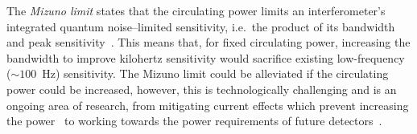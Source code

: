 \label{sec:circulating_power}

The \emph{Mizuno limit} states that the circulating power limits an interferometer's integrated quantum noise--limited sensitivity, i.e.\ the product of its bandwidth and peak sensitivity~\cite{miaoFundamentalQuantumLimit2017}.
This means that, for fixed circulating power, increasing the bandwidth to improve kilohertz sensitivity would sacrifice existing low-frequency ($\sim100$~Hz) sensitivity. %
The Mizuno limit could be alleviated if the circulating power could be increased, however, this is technologically challenging and is an ongoing area of research, from mitigating current effects which prevent increasing the power~\cite{Brooks_2021,PhysRevLett.114.161102} to working towards the power requirements of future detectors~\cite{hardwick_2019}. 
